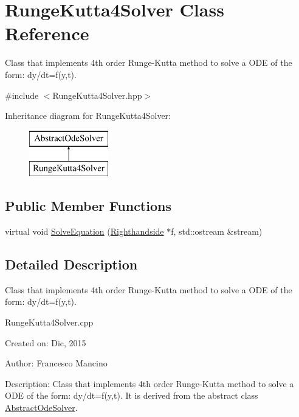 \hypertarget{class_runge_kutta4_solver}{}\section{Runge\+Kutta4\+Solver Class Reference}
\label{class_runge_kutta4_solver}


Class that implements 4th order Runge-\/\+Kutta method to solve a O\+D\+E of the form\+: dy/dt=f(y,t).  




{\ttfamily \#include $<$Runge\+Kutta4\+Solver.\+hpp$>$}

Inheritance diagram for Runge\+Kutta4\+Solver\+:\begin{figure}[H]
\begin{center}
\leavevmode
\includegraphics[height=2.000000cm]{class_runge_kutta4_solver}
\end{center}
\end{figure}
\subsection*{Public Member Functions}
\begin{DoxyCompactItemize}
\item 
virtual void \hyperlink{class_runge_kutta4_solver_acd37986ea1784f8ee4ae27f1614b06b8}{Solve\+Equation} (\hyperlink{class_righthandside}{Righthandside} $\ast$f, std\+::ostream \&stream)
\end{DoxyCompactItemize}


\subsection{Detailed Description}
Class that implements 4th order Runge-\/\+Kutta method to solve a O\+D\+E of the form\+: dy/dt=f(y,t). 

Runge\+Kutta4\+Solver.\+cpp

Created on\+: Dic, 2015 \begin{DoxyVerb}Author: Francesco Mancino
\end{DoxyVerb}


Description\+: Class that implements 4th order Runge-\/\+Kutta method to solve a O\+D\+E of the form\+: dy/dt=f(y,t). It is derived from the abstract class \hyperlink{class_abstract_ode_solver}{Abstract\+Ode\+Solver}. 

